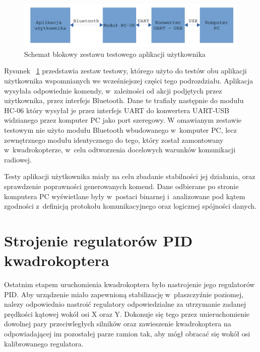 \begin{figure}[H]
	\centering
	\includegraphics[scale=0.2]{Pictures/TestyAplikacji.png}
	\caption[Schemat blokowy zestawu testowego aplikacji użytkownika]{Schemat blokowy zestawu testowego aplikacji użytkownika}
	\label{fig:UserAplication_test}
\end{figure}

Rysunek ~\ref{fig:UserAplication_test} przedstawia zestaw testowy, którego użyto do testów obu aplikacji użytkownika wspomnianych we wcześniejszej części tego podrozdziału. Aplikacja wysyłała odpowiednie komendy, w~zależności od akcji podjętych przez użytkownika, przez interfejs Bluetooth. Dane te trafiały następnie do modułu HC-06 który wysyłał je przez interfejs UART do konwertera UART-USB widzianego przez komputer PC jako port szeregowy. W omawianym zestawie testowym nie użyto modułu Bluetooth wbudowanego w~komputer PC, lecz zewnętrznego modułu identycznego do tego, który został zamontowany w~kwadrokopterze, w~celu odtworzenia docelowych warunków komunikacji radiowej. 

Testy aplikacji użytkownika miały na celu zbadanie stabilności jej działania, oraz sprawdzenie poprawności generowanych komend. Dane odbierane po stronie komputera PC wyświetlane były w~postaci binarnej i~analizowane pod kątem zgodności z~definicją protokołu komunikacyjnego oraz logicznej spójności danych.

\section{Strojenie regulatorów PID kwadrokoptera}

Ostatnim etapem uruchomienia kwadrokoptera było nastrojenie jego regulatorów PID. Aby urządzenie miało zapewnioną stabilizację w~płaszczyźnie poziomej, nalezy odpowiednio nastroić regulatory odpowiedzialne za utrzymanie zadanej prędkości kątowej wokół osi X oraz Y. Dokonuje się tego przez unieruchomienie dowolnej pary przeciwległych silników oraz zawieszenie kwadrokoptera na odpowiadającej im pozostałej parze ramion tak, aby mógł obracać się wokół osi kalibrowanego regulatora.

